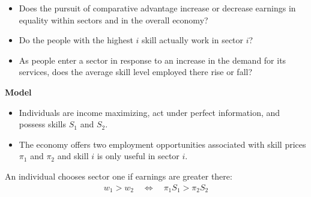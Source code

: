 \begin{frame}
	\begin{itemize}\setlength\itemsep{1em}
		\item Does the pursuit of comparative advantage increase or decrease earnings in equality within sectors and in the overall economy?
		\item Do the people with the highest $i$ skill actually work in sector $i$?
		\item As people enter a sector in response to an increase in the demand for its services, does the average skill level employed there rise or fall?
	\end{itemize}
\end{frame}
\begin{frame}
	\textbf{\cite{Roy.1951} Model}
	\begin{itemize}\setlength\itemsep{1em}
		\item Individuals are income maximizing, act under perfect information, and possess skills $S_1$ and $S_2$.
		\item The economy offers two employment opportunities associated with skill prices $\pi_1$ and $\pi_2$ and skill $i$ is only useful in sector $i$.
	\end{itemize}\medskip
	An individual chooses sector one if earnings are greater there:
	\begin{align*}
	w_1 > w_2 \quad\Longleftrightarrow\quad \pi_1 S_1 > \pi_2 S_2
	\end{align*}
\end{frame}

